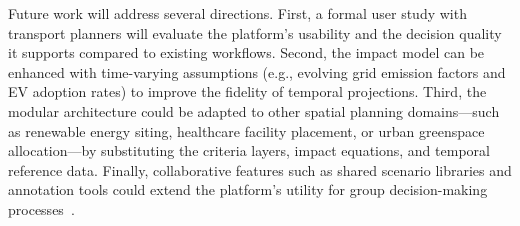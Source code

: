 Future work will address several directions. First, a formal user study with transport planners will evaluate the platform's usability and the decision quality it supports compared to existing workflows. Second, the impact model can be enhanced with time-varying assumptions (e.g., evolving grid emission factors and EV adoption rates) to improve the fidelity of temporal projections. Third, the modular architecture could be adapted to other spatial planning domains---such as renewable energy siting, healthcare facility placement, or urban greenspace allocation---by substituting the criteria layers, impact equations, and temporal reference data. Finally, collaborative features such as shared scenario libraries and annotation tools could extend the platform's utility for group decision-making processes~\cite{jankowski2001gis}.
